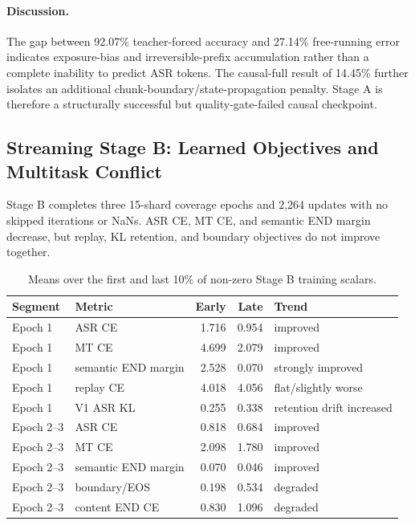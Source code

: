 \documentclass[11pt,a4paper]{article}
\begin{document}
\paragraph{Discussion.}
The gap between 92.07\% teacher-forced accuracy and 27.14\% free-running error indicates exposure-bias and irreversible-prefix accumulation rather than a complete inability to predict ASR tokens. The causal-full result of 14.45\% further isolates an additional chunk-boundary/state-propagation penalty. Stage A is therefore a structurally successful but quality-gate-failed causal checkpoint.

\subsection{Streaming Stage B: Learned Objectives and Multitask Conflict}

Stage B completes three 15-shard coverage epochs and 2,264 updates with no skipped iterations or NaNs. ASR CE, MT CE, and semantic END margin decrease, but replay, KL retention, and boundary objectives do not improve together.

\begin{table}[H]
\centering
\caption{Means over the first and last 10\% of non-zero Stage B training scalars.}
\label{tab:stageb_losses}
\begin{tabularx}{\textwidth}{llrrY}
\toprule
Segment & Metric & Early & Late & Trend \\
\midrule
Epoch 1 & ASR CE & 1.716 & 0.954 & improved \\
Epoch 1 & MT CE & 4.699 & 2.079 & improved \\
Epoch 1 & semantic END margin & 2.528 & 0.070 & strongly improved \\
Epoch 1 & replay CE & 4.018 & 4.056 & flat/slightly worse \\
Epoch 1 & V1 ASR KL & 0.255 & 0.338 & retention drift increased \\
Epoch 2--3 & ASR CE & 0.818 & 0.684 & improved \\
Epoch 2--3 & MT CE & 2.098 & 1.780 & improved \\
Epoch 2--3 & semantic END margin & 0.070 & 0.046 & improved \\
Epoch 2--3 & boundary/EOS & 0.198 & 0.534 & degraded \\
Epoch 2--3 & content END CE & 0.830 & 1.096 & degraded \\
\bottomrule
\end{tabularx}
\end{table}
\end{document}
